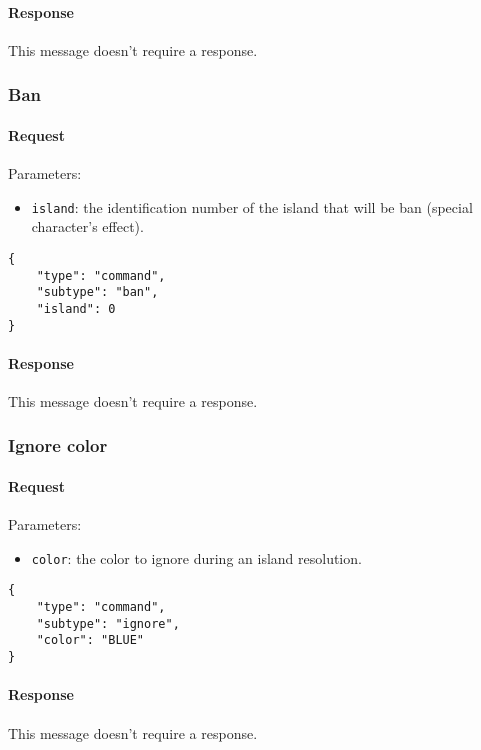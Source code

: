 \documentclass[a4paper]{article}
\begin{document}
	\paragraph{Response} This message doesn't require a response.

	\subsubsection{Ban}

	\paragraph{Request} Parameters:

	\begin{itemize}
		\item \verb|island|: the identification number of the island that will be ban (special character's effect).
	\end{itemize}

	\begin{verbatim}
{
	"type": "command",
	"subtype": "ban",
	"island": 0
}
	\end{verbatim}

	\paragraph{Response} This message doesn't require a response.

	\subsubsection{Ignore color}

	\paragraph{Request} Parameters:

	\begin{itemize}
		\item \verb|color|: the color to ignore during an island resolution.
	\end{itemize}

	\begin{verbatim}
{
	"type": "command",
	"subtype": "ignore",
	"color": "BLUE"
}
	\end{verbatim}

	\paragraph{Response} This message doesn't require a response.
\end{document}

